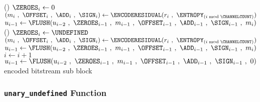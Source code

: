 {{{{{{      }(){
        $\text{\ZEROES}_i \leftarrow 0$\;
        $(m_i~,~\text{\OFFSET}_i~,~\text{\ADD}_i~,~\text{\SIGN}_i) \leftarrow \ENCODERESIDUAL(r_i~,~\text{\ENTROPY}_{(i \bmod \text{\CHANNELCOUNT})})$\;
        $u_{i - 1} \leftarrow \FLUSH(u_{i - 2}~,~\text{\ZEROES}_{i - 1}~,~m_{i - 1}~,~\text{\OFFSET}_{i - 1}~,~\text{\ADD}_{i - 1}~,~\text{\SIGN}_{i - 1}~,~m_i)$\;
      }
    }
  }(){
    $\text{\ZEROES}_i \leftarrow \text{\UNDEFINED}$\;
    $(m_i~,~\text{\OFFSET}_i~,~\text{\ADD}_i~,~\text{\SIGN}_i) \leftarrow \ENCODERESIDUAL(r_i~,~\text{\ENTROPY}_{(i \bmod \text{\CHANNELCOUNT})})$\;
    $u_{i - 1} \leftarrow \FLUSH(u_{i - 2}~,~\text{\ZEROES}_{i - 1}~,~m_{i - 1}~,~\text{\OFFSET}_{i - 1}~,~\text{\ADD}_{i - 1}~,~\text{\SIGN}_{i - 1}~,~m_i)$\;
  }
  $i \leftarrow i + 1$\;
}
\BlankLine
{}
$u_{i - 1} \leftarrow \FLUSH(u_{i - 2}~,~\text{\ZEROES}_{i - 1}~,~m_{i - 1}~,~\text{\OFFSET}_{i - 1}~,~\text{\ADD}_{i - 1}~,~\text{\SIGN}_{i - 1}~,~0)$\;
\BlankLine
\Return encoded bitstream sub block\;
\EALGORITHM

\subsubsection{\texttt{unary\_undefined} Function}
\EALGORITHM
}

\clearpage

{
}}
